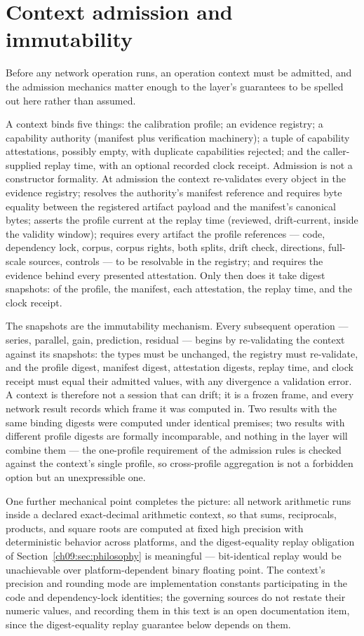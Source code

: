 \section{Context admission and immutability}\label{ch09:sec:context}

Before any network operation runs, an operation context must be admitted,
and the admission mechanics matter enough to the layer's guarantees to be
spelled out here rather than assumed.

A context binds five things: the calibration profile; an evidence
registry; a capability authority (manifest plus verification machinery);
a tuple of capability attestations, possibly empty, with duplicate
capabilities rejected; and the caller-supplied replay time, with an
optional recorded clock receipt. Admission is not a constructor
formality. At admission the context re-validates every object in the
evidence registry; resolves the authority's manifest reference and
requires byte equality between the registered artifact payload and the
manifest's canonical bytes; asserts the profile current at the replay
time (reviewed, drift-current, inside the validity window); requires
every artifact the profile references --- code, dependency lock, corpus,
corpus rights, both splits, drift check, directions, full-scale sources,
controls --- to be resolvable in the registry; and requires the evidence
behind every presented attestation. Only then does it take digest
snapshots: of the profile, the manifest, each attestation, the replay
time, and the clock receipt.

The snapshots are the immutability mechanism. Every subsequent operation
--- series, parallel, gain, prediction, residual --- begins by
re-validating the context against its snapshots: the types must be
unchanged, the registry must re-validate, and the profile digest,
manifest digest, attestation digests, replay time, and clock receipt
must equal their admitted values, with any divergence a validation
error. A context is therefore not a session that can drift; it is a
frozen frame, and every network result records which frame it was
computed in. Two results with the same binding digests were computed
under identical premises; two results with different profile digests are
formally incomparable, and nothing in the layer will combine them ---
the one-profile requirement of the admission rules is checked against
the context's single profile, so cross-profile aggregation is not a
forbidden option but an unexpressible one.

One further mechanical point completes the picture: all network
arithmetic runs inside a declared exact-decimal arithmetic context, so
that sums, reciprocals, products, and square roots are computed at fixed
high precision with deterministic behavior across platforms, and the
digest-equality replay obligation of
Section~\ref{ch09:sec:philosophy} is meaningful --- bit-identical
replay would be unachievable over platform-dependent binary floating
point. The context's precision and rounding mode are implementation
constants participating in the code and dependency-lock identities; the
governing sources do not restate their numeric values, and recording
them in this text is an open documentation item, since the
digest-equality replay guarantee below depends on them.

